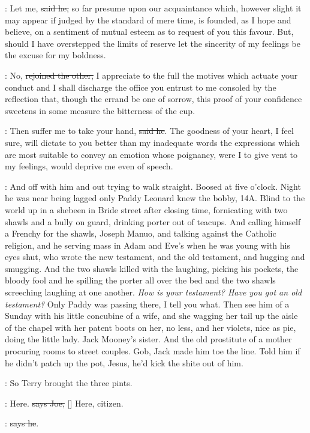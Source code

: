 \doran:
Let me, \sout{said he,}
so far presume upon our acquaintance which, however
slight it may appear if judged by the standard of mere time, is founded,
as I hope and believe, on a sentiment of mutual esteem as to request of
you this favour. But, should I have overstepped the limits of reserve
let the sincerity of my feelings be the excuse for my boldness.

\Bloom:
No, \sout{rejoined the other,}
I appreciate to the full the motives which
actuate your conduct and I shall discharge the office you entrust
to me consoled by the reflection that, though the errand be one of
sorrow, this proof of your confidence sweetens in some measure the
bitterness of the cup.

\doran:
Then suffer me to take your hand, \sout{said he}.
The goodness of your heart, I
feel sure, will dictate to you better than my inadequate words the
expressions which are most suitable to convey an emotion whose
poignancy, were I to give vent to my feelings, would deprive me even of
speech.

\Nq:
And off with him and out trying to walk straight. Boosed at five
o'clock. Night he was near being lagged only Paddy Leonard knew the bobby,
14A. Blind to the world up in a shebeen in Bride street after closing
time, fornicating with two shawls and a bully on guard, drinking porter
out of teacups. And calling himself a Frenchy for the shawls, Joseph
Manuo, and talking against the Catholic religion, and he serving mass in
Adam and Eve's when he was young with his eyes shut, who wrote the new
testament, and the old testament, and hugging and smugging. And the two
shawls killed with the laughing, picking his pockets, the bloody
fool and he spilling the porter all over the bed and the two shawls
screeching laughing at one another. \emph{How is your testament? Have you
got an old testament?} Only Paddy was passing there, I tell you what.
Then see him of a Sunday with his little concubine of a wife, and
she wagging her tail up the aisle of the chapel with her patent boots
on her, no less, and her violets, nice as pie, doing the little lady.
Jack Mooney's sister. And the old prostitute of a mother
procuring rooms to street couples. Gob, Jack made him toe the line. Told
him if he didn't patch up the pot, Jesus, he'd kick the shite out of him.

\Nq:
So Terry brought the three pints.

\joe:
Here. \sout{says Joe,}
[] Here, citizen.

\citizen:
 \sout{says he}.

